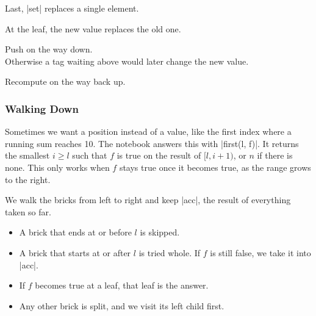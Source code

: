 Last, \code|set| replaces a single element.


\begin{notes}
\begin{lines}
\item[Line 54] At the leaf, the new value replaces the old one.
\item[Line 56] Push on the way down. \\
Otherwise a tag waiting above would later change the new value.
\item[Line 59] Recompute on the way back up.
\end{lines}
\end{notes}

\subsubsection{Walking Down}
Sometimes we want a position instead of a value, like the first index where a running sum reaches 10. The notebook answers this with \code|first(l, f)|. It returns the smallest \(i \ge l\) such that \(f\) is true on the result of \([l, i + 1)\), or \(n\) if there is none. This only works when \(f\) stays true once it becomes true, as the range grows to the right.

We walk the bricks from left to right and keep \code|acc|, the result of everything taken so far.
\begin{itemize}
\item A brick that ends at or before \(l\) is skipped.
\item A brick that starts at or after \(l\) is tried whole. If \(f\) is still false, we take it into \code|acc|.
\item If \(f\) becomes true at a leaf, that leaf is the answer.
\item Any other brick is split, and we visit its left child first.
\end{itemize}

